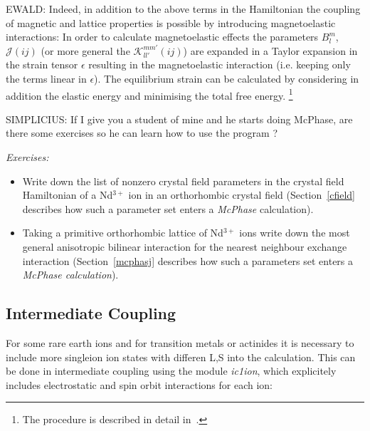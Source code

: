 \documentclass[twoside]{article}
\newcommand{\prg}{\sl}
\newcommand{\EE}{\hspace*{-1cm} EWALD: }
\newcommand{\PP}{\hspace*{-1cm} SIMPLICIUS: }
\begin{document}
\EE  Indeed, in  addition to the above terms in the Hamiltonian the coupling of magnetic and lattice properties
is possible by introducing magnetoelastic interactions:
In order to calculate magnetoelastic effects the parameters 
$B_l^m$, ${\mathcal J}(ij)$ (or more general
the ${\mathcal K}_{ll'}^{mm'}(ij)$) are expanded in a Taylor expansion in the strain tensor
$\epsilon$ resulting in the magnetoelastic interaction (i.e. keeping only the terms linear
in $\epsilon$). The equilibrium strain can be 
calculated by considering in addition the elastic energy and minimising the total free energy.
\footnote{The procedure is described in detail in~\cite{rotter02-8885}.}
 
\PP If I give you a student of mine and he starts doing McPhase, are there
some exercises so he can learn how to use the program ?

\vspace{1cm}

{\em Exercises:}
\begin{itemize}
\item Write down the list of nonzero crystal field parameters in the crystal field Hamiltonian
of a Nd$^{3+}$ ion in an orthorhombic crystal field (Section~\ref{cfield} describes how such a parameter set
enters a {\prg McPhase} calculation).
\item Taking a primitive orthorhombic lattice of Nd$^{3+}$ ions write down the most general
anisotropic bilinear interaction  for the nearest neighbour exchange interaction
(Section~\ref{mcphasj} describes how such a parameters set enters a {\prg McPhase calculation}).
\end{itemize}


\subsection{Intermediate Coupling}

For some rare earth ions and for transition metals or actinides it is necessary to
include more singleion ion states with differen L,S into the calculation. This
can be done in intermediate coupling using the module {\prg ic1ion}, which
explicitely includes electrostatic and  spin orbit interactions for each ion:
\end{document}
